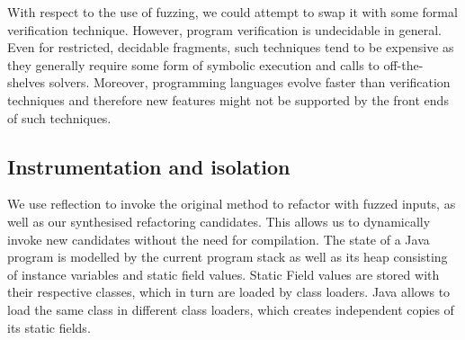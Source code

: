\documentclass[sigconf,review,anonymous]{acmart}
\begin{document}

With respect to the use of fuzzing,
we could attempt to swap it with some formal verification technique.
However, program verification is undecidable in general.
Even for restricted, decidable fragments, such
techniques tend to be expensive as they generally require some form of
symbolic execution and calls to off-the-shelves solvers.  Moreover,
programming languages evolve faster than verification techniques and
therefore new features might not be supported by the front ends of
such techniques.






\subsection{Instrumentation and isolation}

We use reflection to invoke the original method to refactor with fuzzed inputs,
as well as our synthesised refactoring candidates. This allows us to dynamically
invoke new candidates without the need for compilation. The state of a Java
program is modelled by the current program stack as well as its heap consisting
of instance variables and static field values. Static Field values are stored
with their respective classes, which in turn are loaded by class loaders. Java
allows to load the same class in different class loaders, which creates
independent copies of its static fields.
\end{document}
